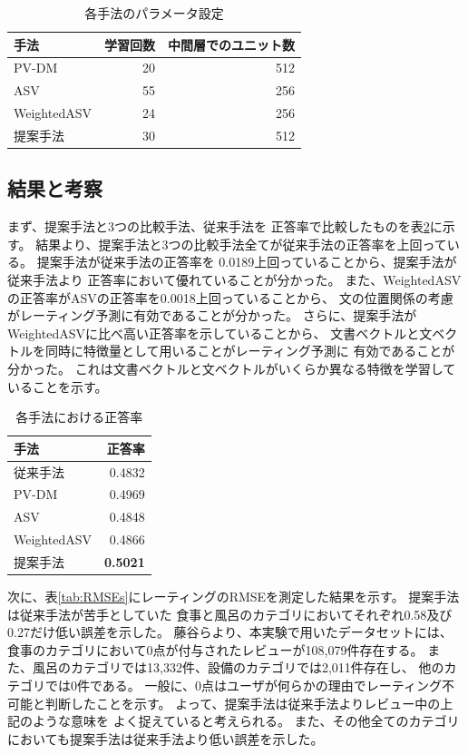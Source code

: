 \documentclass[twocolumn,a4paper]{ltjarticle}
\begin{document}
\begin{table}[b!]
  \caption{各手法のパラメータ設定}
  \centering
  \begin{tabular}{l | r r} \label{tab:ParametersOfMethods}
    手法 & 学習回数 & 中間層でのユニット数 \\
    \hline
    PV-DM & 20 & 512 \\
    ASV & 55 & 256 \\
    WeightedASV & 24 & 256 \\
    提案手法 & 30 & 512 \\
  \end{tabular}
\end{table}


\subsection{結果と考察}

まず、提案手法と3つの比較手法、従来手法\cite{fujitani15}を
正答率で比較したものを表\ref{tab:Accuracies}に示す。
結果より、提案手法と3つの比較手法全てが従来手法の正答率を上回っている。
提案手法が従来手法\cite{fujitani15}の正答率を
0.0189上回っていることから、提案手法が従来手法\cite{fujitani15}より
正答率において優れていることが分かった。
また、WeightedASVの正答率がASVの正答率を0.0018上回っていることから、
文の位置関係の考慮がレーティング予測に有効であることが分かった。
さらに、提案手法がWeightedASVに比べ高い正答率を示していることから、
文書ベクトルと文ベクトルを同時に特徴量として用いることがレーティング予測に
有効であることが分かった。
これは文書ベクトルと文ベクトルがいくらか異なる特徴を学習していることを示す。

\begin{table}[b!]
  \caption{各手法における正答率}
  \centering
  \begin{tabular}{l | r} \label{tab:Accuracies}
    手法 & 正答率 \\
    \hline
    従来手法\cite{fujitani15}  & 0.4832 \\
    PV-DM & 0.4969 \\
    ASV & 0.4848 \\
    WeightedASV & 0.4866 \\
    提案手法 & \textbf{0.5021} \\
  \end{tabular}
\end{table}

次に、表\ref{tab:RMSEs}にレーティングのRMSEを測定した結果を示す。
提案手法は従来手法\cite{fujitani15}が苦手としていた
食事と風呂のカテゴリにおいてそれぞれ0.58及び0.27だけ低い誤差を示した。
藤谷ら\cite{fujitani15}より、本実験で用いたデータセットには、
食事のカテゴリにおいて0点が付与されたレビューが108,079件存在する。
また、風呂のカテゴリでは13,332件、設備のカテゴリでは2,011件存在し、
他のカテゴリでは0件である。
一般に、0点はユーザが何らかの理由でレーティング不可能と判断したことを示す。
よって、提案手法は従来手法\cite{fujitani15}よりレビュー中の上記のような意味を
よく捉えていると考えられる。
また、その他全てのカテゴリにおいても提案手法は従来手法より低い誤差を示した。
\end{document}
